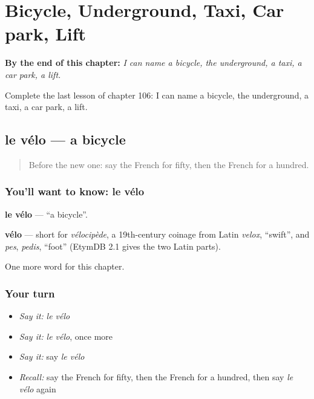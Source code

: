 
\chapter{Bicycle, Underground, Taxi, Car park, Lift}
\label{ch:fr-bicycle-underground-taxi-car-park-lift}

\begin{chapteropening}
\textbf{By the end of this chapter:} \emph{I can name a bicycle, the underground, a taxi, a car park, a lift.}

Complete the last lesson of chapter 106: I can name a bicycle, the underground, a taxi, a car park, a lift.
\end{chapteropening}

\section[le vélo]{le vélo — a bicycle}

\label{lesson:FR-C106-velo}



\begin{quote}
Before the new one: say the French for fifty, then the French for a hundred.
\end{quote}

\subsection*{You'll want to know: le vélo}
\textbf{le vélo} — \textquotedblleft{}a bicycle\textquotedblright{}.

\begin{cousinweb}
\textbf{vélo} — short for \emph{vélocipède}, a 19th-century coinage from Latin \emph{velox}, \textquotedblleft{}swift\textquotedblright{}, and \emph{pes}, \emph{pedis}, \textquotedblleft{}foot\textquotedblright{} (EtymDB 2.1 gives the two Latin parts).
\end{cousinweb}

\begin{grammarlens}[title={What you've built}]
One more word for this chapter.
\end{grammarlens}

\subsection*{Your turn}
\begin{itemize}
\raggedright
  \item \emph{Say it:} \emph{le vélo}
  \item \emph{Say it:} \emph{le vélo}, once more
  \item \emph{Say it:} say \emph{le vélo}
  \item \emph{Recall:} say the French for fifty, then the French for a hundred, then say \emph{le vélo} again
\end{itemize}

